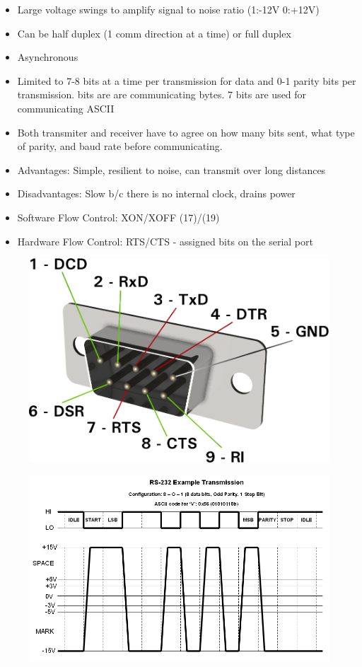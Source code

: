 \documentclass{hw}
\begin{document}
\begin{itemize}
  \item Large voltage swings to amplify signal to noise ratio (1:-12V 0:+12V)
  \item Can be half duplex (1 comm direction at a time) or full duplex
  \item Asynchronous 
  \item Limited to 7-8 bits at a time per transmission for data and 0-1 parity 
    bits per transmission.
     bits are are communicating bytes. 7 bits are used for communicating
    ASCII
  \item Both transmiter and receiver have to agree on how many bits sent, what
    type of parity, and baud rate before communicating.
  \item Advantages: Simple, resilient to noise, can transmit over long distances
  \item Disadvantages: Slow b/c there is no internal clock, drains power
  \item Software Flow Control: XON/XOFF (17)/(19)
  \item Hardware Flow Control: RTS/CTS - assigned bits on the serial port
\end{itemize}
\begin{figure}[H]
  \centering
  \includegraphics[scale=.25]{rs2}
\end{figure}
\begin{figure}[H]
  \centering
  \includegraphics[scale=.4]{rs3}
\end{figure}
\end{document}
